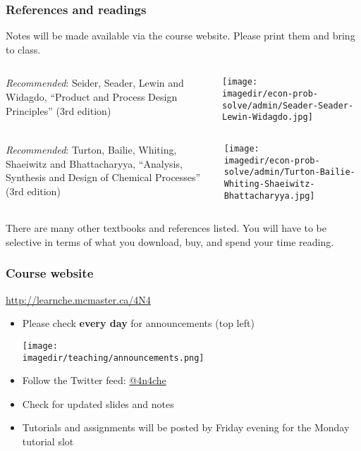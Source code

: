 \begin{frame}\frametitle{References and readings}

	Notes will be made available via the course website. Please print them and bring to class.


	\vspace{12pt}

	\begin{columns}[t]
			\emph{Recommended}: Seider, Seader, Lewin and Widagdo, ``Product and Process Design Principles'' (3rd edition)
			\vspace{-1cm}
			\begin{center}
				\texttt{[image: \\imagedir/econ-prob-solve/admin/Seader-Seader-Lewin-Widagdo.jpg]}
			\end{center}
	\end{columns}

	\vspace{12pt}
	\begin{columns}[t]
			\emph{Recommended}: Turton, Bailie, Whiting, Shaeiwitz and Bhattacharyya, ``Analysis, Synthesis and Design of Chemical Processes'' (3rd edition)
			\vspace{-1cm}
			\begin{center}
				\texttt{[image: \\imagedir/econ-prob-solve/admin/Turton-Bailie-Whiting-Shaeiwitz-Bhattacharyya.jpg]}
			\end{center}
	\end{columns}


	\vspace{12pt}
	There are many other textbooks and references listed. You will have to be selective in terms of what you download, buy, and spend your time reading.
\end{frame}

\begin{frame}\frametitle{Course website}
	\begin{exampleblock}{}
		\centering
		\href{http://learnche.mcmaster.ca/4N4}{http://learnche.mcmaster.ca/4N4}
	\end{exampleblock}
	\begin{itemize}
		\item	Please check \textbf{every day} for announcements {\tiny (top left)}
		\begin{flushright}
			\texttt{[image: \\imagedir/teaching/announcements.png]}
		\end{flushright}

		\item	Follow the Twitter feed: \href{https://twitter.com/4n4che}{@4n4che}
		\item	Check for updated slides and notes
		\item	Tutorials and assignments will be posted by Friday evening for the Monday tutorial slot
	\end{itemize}
\end{frame}

